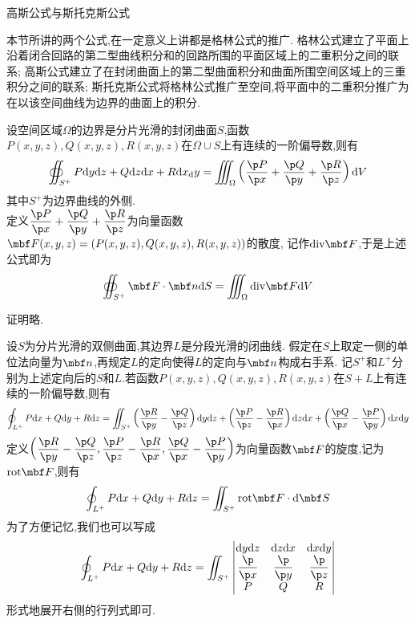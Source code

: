 \documentclass{ctexart}
\begin{document}
\pagestyle{empty}
\begin{center}\large 高斯公式与斯托克斯公式\end{center}
本节所讲的两个公式,在一定意义上讲都是格林公式的推广.%
格林公式建立了平面上沿着闭合回路的第二型曲线积分和的回路所围的平面区域上的二重积分之间的联系;%
高斯公式建立了在封闭曲面上的第二型曲面积分和曲面所围空间区域上的三重积分之间的联系;%
斯托克斯公式将格林公式推广至空间,将平面中的二重积分推广为在以该空间曲线为边界的曲面上的积分.\\
\begin{formal}[1.1 高斯公式]
    设空间区域$\Omega$的边界是分片光滑的封闭曲面$S$,函数$P(x,y,z),Q(x,y,z),R(x,y,z)$在$\Omega\cup S$上有连续的一阶偏导数,则有
    \[\oiint_{S^+}P\di y\di z+Q\di z\dx+R\dx_\di y=\iiint_{\Omega}\left(\dfrac{\p P}{\p x}+\dfrac{\p Q}{\p y}+\dfrac{\p R}{\p z}\right)\di V\]
    其中$S^+$为边界曲线的外侧.\\
    定义$\dfrac{\p P}{\p x}+\dfrac{\p Q}{\p y}+\dfrac{\p R}{\p z}$为向量函数$\mbf F(x,y,z)=\left(P(x,y,z),Q(x,y,z),R(x,y,z)\right)$的散度,%
    记作$\text{div}\mbf F$,于是上述公式即为
    \[\oiint_{S^+}\mbf F\cdot\mbf n\di S=\iiint_{\Omega}\text{div}\mbf F\di V\]
\end{formal}\noindent
证明略.\\
\begin{formal}[2.1 斯托克斯公式]
    设$S$为分片光滑的双侧曲面,其边界$L$是分段光滑的闭曲线.%
    假定在$S$上取定一侧的单位法向量为$\mbf n$,再规定$L$的定向使得$L$的定向与$\mbf n$构成右手系.%
    记$S^+$和$L^+$分别为上述定向后的$S$和$L$.若函数$P(x,y,z),Q(x,y,z),R(x,y,z)$在$S+L$上有连续的一阶偏导数,则有
    \[\oint_{L^+}P\dx+Q\di y+R\di z=\iint_{S^+}\left(\dfrac{\p R}{\p y}-\dfrac{\p Q}{\p z}\right)\di y\di z+\left(\dfrac{\p P}{\p z}-\dfrac{\p R}{\p x}\right)\di z\di x+\left(\dfrac{\p Q}{\p x}-\dfrac{\p P}{\p y}\right)\dx\di y\]
    定义$\left(\dfrac{\p R}{\p y}-\dfrac{\p Q}{\p z},\dfrac{\p P}{\p z}-\dfrac{\p R}{\p x},\dfrac{\p Q}{\p x}-\dfrac{\p P}{\p y}\right)$为向量函数$\mbf F$的旋度,记为$\text{rot}\mbf F$,则有
    \[\oint_{L^+}P\dx+Q\di y+R\di z=\iint_{S^+}\text{rot}\mbf F\cdot\di \mbf S\]
    为了方便记忆,我们也可以写成
    \[\oint_{L^+}P\dx+Q\di y+R\di z=\iint_{S^+}\begin{vmatrix}
        \di y\di z&\di z\di x&\di x\di y\\
        \dfrac{\p}{\p x}&\dfrac{\p}{\p y}&\dfrac{\p}{\p z}\\
        P&Q&R
    \end{vmatrix}\]
    形式地展开右侧的行列式即可.
\end{formal}
\end{document}
